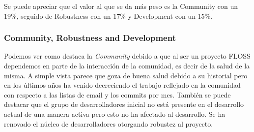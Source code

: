 \documentclass[11pt]{scrartcl}
\begin{document}
\par Se puede apreciar que el valor al que se da m\'as peso es la Community con un 19\%, seguido de Robustness con un 17\% y Development con un 15\%. 

\subsubsection{Community, Robustness and Development}

\par Podemos ver como destaca la \emph{Community} debido a que al ser un proyecto FLOSS dependemos en parte de la interacci\'on de la comunidad, es decir de la salud de la misma. A simple vista parece que goza de buena salud debido a su historial pero en los \'ultimos a\~nos ha venido decreciendo el trabajo reflejado en la comunidad con respecto a las listas de email y los commits por mes. Tambi\'en se puede destacar que el grupo de desarrolladores inicial no est\'a presente en el desarrollo actual de una manera activa pero esto no ha afectado al desarrollo. Se ha renovado el n\'ucleo de desarrolladores otorgando robustez al proyecto.
\end{document}
